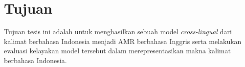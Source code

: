 \section{Tujuan}

Tujuan tesis ini adalah untuk menghasilkan sebuah model \textit{cross-lingual} \amrparsing{} dari kalimat berbahasa Indonesia menjadi \gls{AMR} berbahasa Inggris serta melakukan evaluasi kelayakan model tersebut dalam merepresentasikan makna kalimat berbahasa Indonesia.
